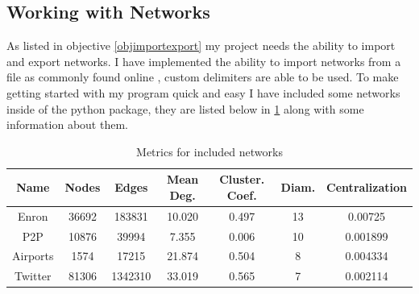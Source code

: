 \documentclass{article}
\begin{document}
\subsection{Working with Networks}

As listed in objective \ref{objimportexport} my project needs the ability to import and export networks.
I have implemented the ability to import networks from a file as commonly found online \cite{}, custom delimiters are able to be used.
To make getting started with my program quick and easy I have included some networks inside of the python package, they are listed below in \ref{includedNets} along with some information about them.

\begin{table}[h]
	\centering
	\begin{tabular}{|c|c|c|c|c|c|c|}
		\hline
		\textbf{Name} & \textbf{Nodes} & \textbf{Edges} & \textbf{Mean Deg.} & \textbf{Cluster. Coef.} & \textbf{Diam.} & \textbf{Centralization} \\
		\hline
		Enron         & 36692          & 183831         & 10.020             & 0.497                   & 13             & 0.00725                 \\
		\hline
		P2P           & 10876          & 39994          & 7.355              & 0.006                   & 10             & 0.001899                \\
		\hline
		Airports      & 1574           & 17215          & 21.874             & 0.504                   & 8              & 0.004334                \\
		\hline
		Twitter       & 81306          & 1342310        & 33.019             & 0.565                   & 7              & 0.002114                \\
		\hline
	\end{tabular}
	\caption{Metrics for included networks}
	\label{includedNets}
\end{table}
\end{document}
